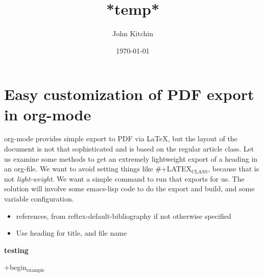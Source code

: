 \documentclass[12pt]{article}
\author{John Kitchin}
\date{\today}
\title{ *temp*}
\providecommand{\alert}[1]{\textbf{#1}}
\begin{document}
\maketitle
\tableofcontents

\section{Easy customization of PDF export in org-mode}
\label{sec-1}

org-mode provides simple export to PDF via \LaTeX{}, but the layout of the document is not that sophisticated and is based on the regular article class. Let us examine some methods to get an extremely lightweight export of a heading in an org-file. We want to avoid setting things like \#+LATEX$_{\text{CLASS}}$, because that is not \emph{light-weight}. We want a simple command to run that exports for us. The solution will involve some emacs-lisp code to do the export and build, and some variable configuration.

\begin{itemize}
\item references, from reftex-default-bibliography if not otherwise specified
\item Use heading for title, and file name
\end{itemize}


\alert{testing}

+begin$_{\text{example}}$
\end{document}
